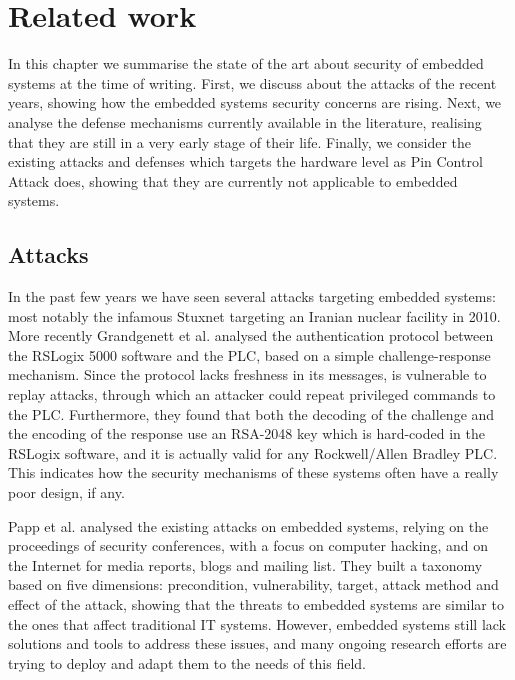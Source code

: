 \chapter{Related work}
\label{chap:related}

In this chapter we summarise the state of the art about security of embedded systems at the time of writing.
First, we discuss about the attacks of the recent years, showing how the embedded systems security concerns are rising.
Next, we analyse the defense mechanisms currently available in the literature, realising that they are still in a very early stage of their life.
Finally, we consider the existing attacks and defenses which targets the hardware level as Pin Control Attack does,
showing that they are currently not applicable to embedded systems.


\section{Attacks}

In the past few years we have seen several attacks targeting embedded systems: most notably the infamous Stuxnet \cite{stuxnet} targeting an Iranian nuclear facility in 2010.
More recently Grandgenett et al. \cite{io-command} analysed the authentication protocol between the RSLogix 5000 software and the PLC, based on a simple challenge-response mechanism.
Since the protocol lacks freshness in its messages, is vulnerable to replay attacks, through which an attacker could repeat privileged commands to the PLC.
Furthermore, they found that both the decoding of the challenge and the encoding of the response use an RSA-2048 key which is hard-coded in the RSLogix software,
and it is actually valid for any Rockwell/Allen Bradley PLC.
This indicates how the security mechanisms of these systems often have a really poor design, if any.

Papp et al. \cite{taxonomy} analysed the existing attacks on embedded systems, relying on the proceedings of security conferences, with a focus on computer hacking,
and on the Internet for media reports, blogs and mailing list.
They built a taxonomy based on five dimensions: precondition, vulnerability, target, attack method and effect of the attack,
showing that the threats to embedded systems are similar to the ones that affect traditional IT systems.
However, embedded systems still lack solutions and tools to address these issues, and many ongoing research efforts are trying to deploy and adapt them to the needs of this field.

